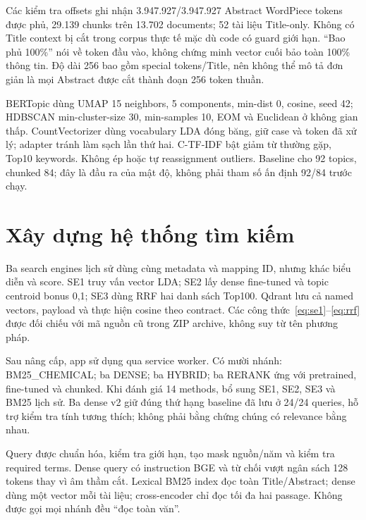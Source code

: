 Các kiểm tra offsets ghi nhận 3.947.927/3.947.927 Abstract WordPiece tokens được phủ, 29.139 chunks trên 13.702 documents; 52 tài liệu Title-only. Không có Title context bị cắt trong corpus thực tế mặc dù code có guard giới hạn. ``Bao phủ 100\%'' nói về token đầu vào, không chứng minh vector cuối bảo toàn 100\% thông tin. Độ dài 256 bao gồm special tokens/Title, nên không thể mô tả đơn giản là mọi Abstract được cắt thành đoạn 256 token thuần.

BERTopic dùng UMAP 15 neighbors, 5 components, min-dist 0, cosine, seed 42; HDBSCAN min-cluster-size 30, min-samples 10, EOM và Euclidean ở không gian thấp. CountVectorizer dùng vocabulary LDA đóng băng, giữ case và token đã xử lý; adapter tránh làm sạch lần thứ hai. C-TF-IDF bật giảm từ thường gặp, Top10 keywords. Không ép  hoặc tự reassignment outliers. Baseline cho 92 topics, chunked 84; đây là đầu ra của mật độ, không phải tham số ấn định 92/84 trước chạy.


\section{Xây dựng hệ thống tìm kiếm}
Ba search engines lịch sử dùng cùng metadata và mapping ID, nhưng khác biểu diễn và score. SE1 truy vấn vector LDA; SE2 lấy dense fine-tuned và topic centroid bonus 0,1; SE3 dùng RRF hai danh sách Top100. Qdrant lưu cả named vectors, payload và thực hiện cosine theo contract. Các công thức~\eqref{eq:se1}--\eqref{eq:rrf} được đối chiếu với mã nguồn cũ trong ZIP archive, không suy từ tên phương pháp.

Sau nâng cấp, app sử dụng  qua service worker. Có mười nhánh: BM25\_CHEMICAL; ba DENSE; ba HYBRID; ba RERANK ứng với pretrained, fine-tuned và chunked. Khi đánh giá 14 methods, bổ sung SE1, SE2, SE3 và BM25 lịch sử. Ba dense v2 giữ đúng thứ hạng baseline đã lưu ở 24/24 queries, hỗ trợ kiểm tra tính tương thích; không phải bằng chứng chúng có relevance bằng nhau.

Query được chuẩn hóa, kiểm tra giới hạn, tạo mask nguồn/năm và kiểm tra required terms. Dense query có instruction BGE và từ chối vượt ngân sách 128 tokens thay vì âm thầm cắt. Lexical BM25 index đọc toàn Title/Abstract; dense dùng một vector mỗi tài liệu; cross-encoder chỉ đọc tối đa hai passage. Không được gọi mọi nhánh đều ``đọc toàn văn''.

